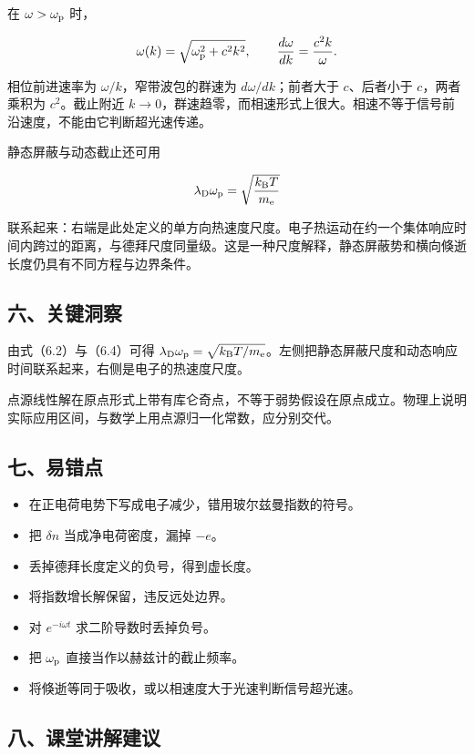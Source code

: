 \documentclass[12pt,a4paper,fontset=fandol]{ctexart}
\providecommand{\tightlist}{\setlength{\itemsep}{0pt}\setlength{\parskip}{0pt}}
\begin{document}
在 \(\omega>\omega_{\rm p}\) 时，

\[
\omega(k)=\sqrt{\omega_{\rm p}^2+c^2k^2},\qquad
\frac{d\omega}{dk}=\frac{c^2k}{\omega}.
\]

相位前进速率为 \(\omega/k\)，窄带波包的群速为 \(d\omega/dk\)；前者大于
\(c\)、后者小于 \(c\)，两者乘积为 \(c^2\)。截止附近
\(k\to0\)，群速趋零，而相速形式上很大。相速不等于信号前沿速度，不能由它判断超光速传递。

静态屏蔽与动态截止还可用

\[
\lambda_{\rm D}\omega_{\rm p}
=\sqrt{\frac{k_{\rm B}T}{m_{\rm e}}}
\]

联系起来：右端是此处定义的单方向热速度尺度。电子热运动在约一个集体响应时间内跨过的距离，与德拜尺度同量级。这是一种尺度解释，静态屏蔽势和横向倏逝长度仍具有不同方程与边界条件。

\subsection{六、关键洞察}\label{ux516dux5173ux952eux6d1eux5bdf-5}

由式（6.2）与（6.4）可得
\(\lambda_{\rm D}\omega_{\rm p}=\sqrt{k_{\rm B}T/m_{\rm e}}\)。左侧把静态屏蔽尺度和动态响应时间联系起来，右侧是电子的热速度尺度。

点源线性解在原点形式上带有库仑奇点，不等于弱势假设在原点成立。物理上说明实际应用区间，与数学上用点源归一化常数，应分别交代。

\subsection{七、易错点}\label{ux4e03ux6613ux9519ux70b9-5}

\begin{itemize}
\tightlist
\item
  在正电荷电势下写成电子减少，错用玻尔兹曼指数的符号。
\item
  把 \(\delta n\) 当成净电荷密度，漏掉 \(-e\)。
\item
  丢掉德拜长度定义的负号，得到虚长度。
\item
  将指数增长解保留，违反远处边界。
\item
  对 \(e^{-i\omega t}\) 求二阶导数时丢掉负号。
\item
  把 \(\omega_{\rm p}\) 直接当作以赫兹计的截止频率。
\item
  将倏逝等同于吸收，或以相速度大于光速判断信号超光速。
\end{itemize}

\subsection{八、课堂讲解建议}\label{ux516bux8bfeux5802ux8bb2ux89e3ux5efaux8bae-5}
\end{document}
